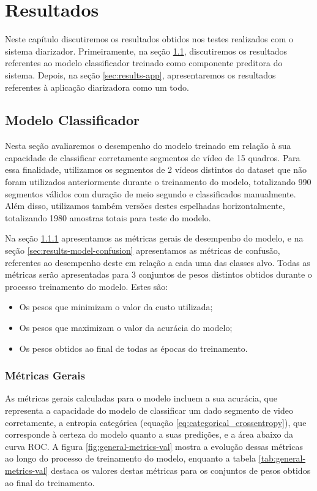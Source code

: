 \chapter{Resultados}
\label{chap:results}

Neste capítulo discutiremos os resultados obtidos nos testes realizados com o sistema diarizador.
Primeiramente, na seção \ref{sec:results-model}, discutiremos os resultados referentes ao modelo classificador treinado como componente preditora do sistema.
Depois, na seção \ref{sec:results-app}, apresentaremos os resultados referentes à aplicação diarizadora como um todo.

\section{Modelo Classificador}
\label{sec:results-model}

Nesta seção avaliaremos o desempenho do modelo treinado em relação à sua capacidade de classificar corretamente segmentos de vídeo de 15 quadros.
Para essa finalidade, utilizamos os segmentos de 2 vídeos distintos do dataset que não foram utilizados anteriormente durante o treinamento do modelo, totalizando 990 segmentos válidos com duração de meio segundo e classificados manualmente.
Além disso, utilizamos também versões destes espelhadas horizontalmente, totalizando 1980 amostras totais para teste do modelo.

Na seção \ref{sec:results-model-gen} apresentamos as métricas gerais de desempenho do modelo, e na seção \ref{sec:results-model-confusion} apresentamos as métricas de confusão, referentes ao desempenho deste em relação a cada uma das classes alvo.
Todas as métricas serão apresentadas para 3 conjuntos de pesos distintos obtidos durante o processo treinamento do modelo. Estes são:
\begin{itemize}
    \item Os pesos que minimizam o valor da custo utilizada;
    \item Os pesos que maximizam o valor da acurácia do modelo;
    \item Os pesos obtidos ao final de todas as épocas do treinamento.
\end{itemize}

\subsection{Métricas Gerais}
\label{sec:results-model-gen}

As métricas gerais calculadas para o modelo incluem a sua acurácia, que representa a capacidade do modelo de classificar um dado segmento de video corretamente, a entropia categórica (equação \ref{eq:categorical_crossentropy}), que corresponde à certeza do modelo quanto a suas predições, e a área abaixo da curva ROC.
A figura \ref{fig:general-metrics-val} mostra a evolução dessas métricas ao longo do processo de treinamento do modelo, enquanto a tabela \ref{tab:general-metrics-val} destaca os valores destas métricas para os conjuntos de pesos obtidos ao final do treinamento.

